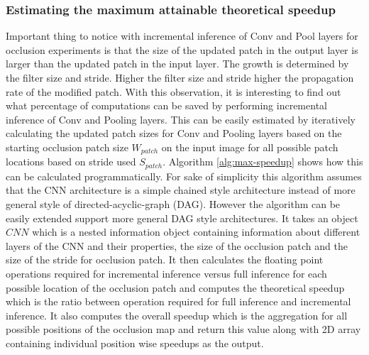 \documentclass[10, sigconf]{acmart}
\begin{document}
\subsubsection{Estimating the maximum attainable theoretical speedup}

Important thing to notice with incremental inference of Conv and Pool layers for occlusion experiments is that the size of the updated patch in the output layer is larger than the updated patch in the input layer.
The growth is determined by the filter size and stride. Higher the filter size and stride higher the propagation rate of the modified patch.
With this observation, it is interesting to find out what percentage of computations can be saved by performing incremental inference of Conv and Pooling layers.
This can be easily estimated by iteratively calculating the updated patch sizes for Conv and Pooling layers based on the starting occlusion patch size $W_{patch}$ on the input image for all possible patch locations based on stride used $S_{patch}$.
Algorithm \ref{alg:max-speedup} shows how this can be calculated programmatically.
For sake of simplicity this algorithm assumes that the CNN architecture is a simple chained style architecture instead of more general style of directed-acyclic-graph (DAG).
However the algorithm can be easily extended support more general DAG style architectures.
It takes an object $CNN$ which is a nested information object containing information about different layers of the CNN and their properties, the size of the occlusion patch and the size of the stride for occlusion patch.
It then calculates the floating point operations required for incremental inference versus full inference for each possible location of the occlusion patch and computes the theoretical speedup which is the ratio between operation required for full inference and incremental inference.
It also computes the overall speedup which is the aggregation for all possible positions of the occlusion map and return this value along with 2D array containing individual position wise speedups as the output.
\end{document}
